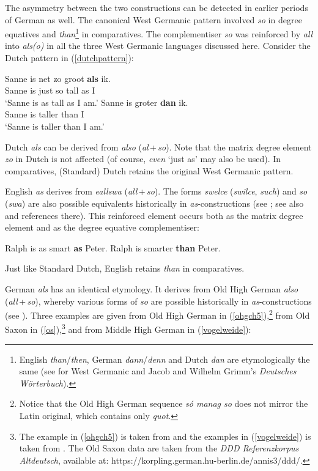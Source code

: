 The asymmetry between the two constructions can be detected in earlier periods of German as well. The canonical West Germanic pattern involved \textit{so} in degree equatives and \textit{than}\footnote{English \textit{than}/\textit{then}, German \textit{dann}/\textit{denn} and Dutch \textit{dan} are etymologically the same (see \citealt{rutten2012} for West Germanic and Jacob and Wilhelm Grimm's \textit{Deutsches Wörterbuch}).} in comparatives. The complementiser \textit{so} was reinforced by \textit{all} into \textit{als(o)} in all the three West Germanic languages discussed here. Consider the Dutch pattern in (\ref{dutchpattern}):

\ea \label{dutchpattern}
\ea \gll Sanne is net zo groot \textbf{als} ik.\\
Sanne is just so tall as I\\
\glt `Sanne is as tall as I am.'
\ex \gll Sanne is groter \textbf{dan} ik.\\
Sanne is taller than I\\
\glt `Sanne is taller than I am.'
\z
\z

Dutch \textit{als} can be derived from \textit{also} (\textit{al}\,+\,\textit{so}). Note that the matrix degree element \textit{zo} in Dutch is not affected (of course, \textit{even} `just as' may also be used). In comparatives, (Standard) Dutch retains the original West Germanic pattern.

English \textit{as} derives from \textit{eallswa} (\textit{all}\,+\,\textit{so}). The forms \textit{swelce} (\textit{swilce}, \textit{such}) and \textit{so} (\textit{swa}) are also possible equivalents historically in \textit{as}-constructions (see \citealt[315--317]{kortmann1997}; see also \citealt[312--314]{lopezcousomendeznaya2014} and references there). This reinforced element occurs both as the matrix degree element and as the degree equative complementiser:

\ea
\ea Ralph is as smart \textbf{as} Peter.
\ex Ralph is smarter \textbf{than} Peter.
\z
\z

Just like Standard Dutch, English retains \textit{than} in comparatives.

German \textit{als} has an identical etymology. It derives from Old High German \textit{also} (\textit{all}\,+\,\textit{so}), whereby various forms of \textit{so} are possible historically in \textit{as}-con\-struc\-tions (see \citealt{jaeger2010}). Three examples are given from Old High German in (\ref{ohgch5}),\footnote{Notice that the Old High German sequence \textit{s\'o manag so} does not mirror the Latin original, which contains only \textit{quot}.} from Old Saxon in (\ref{os}),\footnote{The example in (\ref{ohgch5}) is taken from \citet[64, ex. 65]{jaeger2018} and the examples in (\ref{vogelweide}) is taken from \citet[22, ex. 12]{eggs2006}. The Old Saxon data are taken from the \textit{DDD Referenzkorpus Altdeutsch}, available at: https://korpling.german.hu-berlin.de/annis3/ddd/.} and from Middle High German in (\ref{vogelweide}):

